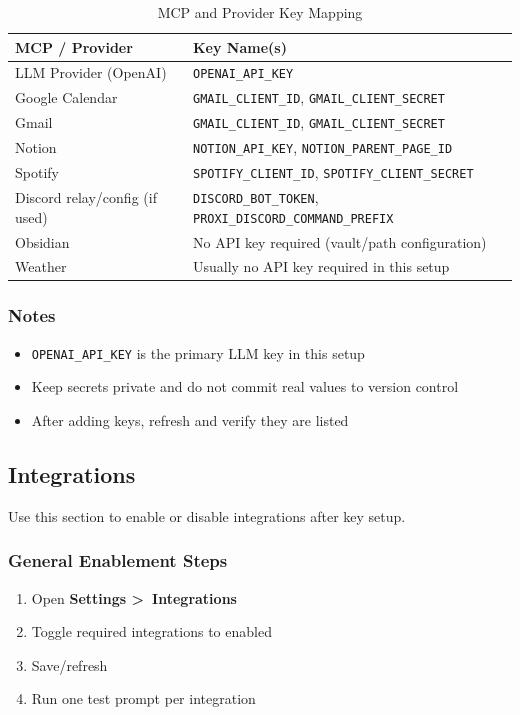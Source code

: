 \documentclass{article}
\begin{document}
\begin{table}[H]
\centering
\caption{MCP and Provider Key Mapping} \label{TblMCPKeyMapping}
\begin{tabularx}{\textwidth}{lX}
\toprule
\textbf{MCP / Provider} & \textbf{Key Name(s)} \\
\midrule
LLM Provider (OpenAI) & \texttt{OPENAI\_API\_KEY} \\
Google Calendar & \texttt{GMAIL\_CLIENT\_ID}, \texttt{GMAIL\_CLIENT\_SECRET} \\
Gmail & \texttt{GMAIL\_CLIENT\_ID}, \texttt{GMAIL\_CLIENT\_SECRET} \\
Notion & \texttt{NOTION\_API\_KEY}, \texttt{NOTION\_PARENT\_PAGE\_ID} \\
Spotify & \texttt{SPOTIFY\_CLIENT\_ID}, \texttt{SPOTIFY\_CLIENT\_SECRET} \\
Discord relay/config (if used) & \texttt{DISCORD\_BOT\_TOKEN}, \texttt{PROXI\_DISCORD\_COMMAND\_PREFIX} \\
Obsidian & No API key required (vault/path configuration) \\
Weather & Usually no API key required in this setup \\
\bottomrule
\end{tabularx}
\end{table}

\subsubsection{Notes}
\begin{itemize}
	\item \texttt{OPENAI\_API\_KEY} is the primary LLM key in this setup
	\item Keep secrets private and do not commit real values to version control
	\item After adding keys, refresh and verify they are listed
\end{itemize}

\subsection{Integrations}

Use this section to enable or disable integrations after key setup.

\subsubsection{General Enablement Steps}
\begin{enumerate}
	\item Open \textbf{Settings \textgreater\ Integrations}
	\item Toggle required integrations to enabled
	\item Save/refresh
	\item Run one test prompt per integration
\end{enumerate}
\end{document}
